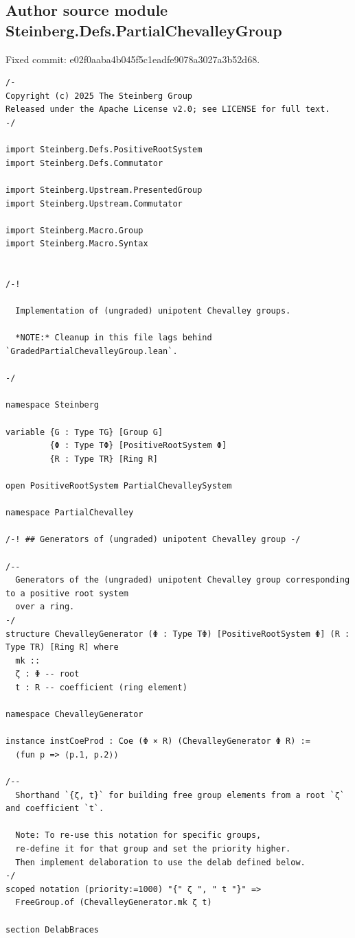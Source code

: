 \subsection*{Author source module Steinberg.Defs.PartialChevalleyGroup}
\noindent Fixed commit: e02f0aaba4b045f5c1eadfe9078a3027a3b52d68.
\begin{Verbatim}
/-
Copyright (c) 2025 The Steinberg Group
Released under the Apache License v2.0; see LICENSE for full text.
-/

import Steinberg.Defs.PositiveRootSystem
import Steinberg.Defs.Commutator

import Steinberg.Upstream.PresentedGroup
import Steinberg.Upstream.Commutator

import Steinberg.Macro.Group
import Steinberg.Macro.Syntax


/-!

  Implementation of (ungraded) unipotent Chevalley groups.

  *NOTE:* Cleanup in this file lags behind `GradedPartialChevalleyGroup.lean`.

-/

namespace Steinberg

variable {G : Type TG} [Group G]
         {Φ : Type TΦ} [PositiveRootSystem Φ]
         {R : Type TR} [Ring R]

open PositiveRootSystem PartialChevalleySystem

namespace PartialChevalley

/-! ## Generators of (ungraded) unipotent Chevalley group -/

/--
  Generators of the (ungraded) unipotent Chevalley group corresponding to a positive root system
  over a ring.
-/
structure ChevalleyGenerator (Φ : Type TΦ) [PositiveRootSystem Φ] (R : Type TR) [Ring R] where
  mk ::
  ζ : Φ -- root
  t : R -- coefficient (ring element)

namespace ChevalleyGenerator

instance instCoeProd : Coe (Φ × R) (ChevalleyGenerator Φ R) :=
  ⟨fun p => ⟨p.1, p.2⟩⟩

/--
  Shorthand `{ζ, t}` for building free group elements from a root `ζ` and coefficient `t`.

  Note: To re-use this notation for specific groups,
  re-define it for that group and set the priority higher.
  Then implement delaboration to use the delab defined below.
-/
scoped notation (priority:=1000) "{" ζ ", " t "}" =>
  FreeGroup.of (ChevalleyGenerator.mk ζ t)

section DelabBraces


\end{Verbatim}
